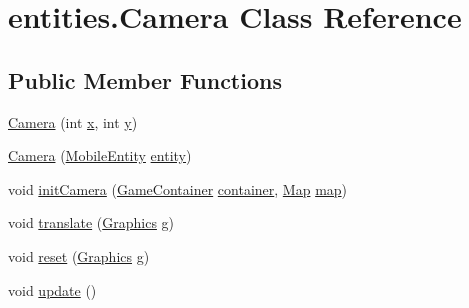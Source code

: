 \hypertarget{classentities_1_1_camera}{}\section{entities.\+Camera Class Reference}
\label{classentities_1_1_camera}
\subsection*{Public Member Functions}
\begin{DoxyCompactItemize}
\item 
\mbox{\hyperlink{classentities_1_1_camera_a38cfcedc6aa02ecc7bcfb6ad050692f3}{Camera}} (int \mbox{\hyperlink{classentities_1_1_camera_a66b52dbb998f7f0a8f0a191d9bf7d35e}{x}}, int \mbox{\hyperlink{classentities_1_1_camera_ab37210b8774bf7d2210ab91bd1656e68}{y}})
\item 
\mbox{\hyperlink{classentities_1_1_camera_a36acc56a0a5627c07779da8116145f50}{Camera}} (\mbox{\hyperlink{classentities_1_1_mobile_entity}{Mobile\+Entity}} \mbox{\hyperlink{classentities_1_1_camera_ae57035ea7f7d7d60fc7da6cd51b93316}{entity}})
\item 
void \mbox{\hyperlink{classentities_1_1_camera_aae34158cc2c20916570929c01605dc5c}{init\+Camera}} (\mbox{\hyperlink{classorg_1_1newdawn_1_1slick_1_1_game_container}{Game\+Container}} \mbox{\hyperlink{classentities_1_1_camera_ab4ac985dbca326ba055c90fd80b1e1ad}{container}}, \mbox{\hyperlink{classentities_1_1_map}{Map}} \mbox{\hyperlink{classentities_1_1_camera_a33fca5e9de17b38aa1ddea3a75e89784}{map}})
\item 
void \mbox{\hyperlink{classentities_1_1_camera_aa751a4113be4d9302fafeb69ab6042d4}{translate}} (\mbox{\hyperlink{classorg_1_1newdawn_1_1slick_1_1_graphics}{Graphics}} g)
\item 
void \mbox{\hyperlink{classentities_1_1_camera_a89429480df11ec77d4b6e76672d77e96}{reset}} (\mbox{\hyperlink{classorg_1_1newdawn_1_1slick_1_1_graphics}{Graphics}} g)
\item 
void \mbox{\hyperlink{classentities_1_1_camera_afc9fce5bc7a2d64ca42a04c5f34f6f8c}{update}} ()
\end{DoxyCompactItemize}
